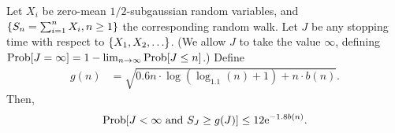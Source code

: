 \begin{lemma}
\label{lem:ACI-inequality}
Let $X_i$ be zero-mean $1/2$-subgaussian random variables,
and $\{ S_n = \sum_{i=1}^n X_i, n \geq 1 \}$ the corresponding random walk.
Let $J$ be any stopping time with respect to $\{ X_1, X_2, \ldots \}$.
(We allow $J$ to take the value $\infty$,
defining $\Prob{J = \infty} = 1 - \lim_{n \to \infty} \Prob{J \leq n}$.)
Define 
\begin{align*}
g(n) & = \sqrt{0.6 n \cdot \log (\log_{1.1}(n) + 1) + n \cdot b(n)}.
\end{align*}
Then, 
\begin{align*}
\Prob{J < \infty \mbox{ and } S_J \geq g(J)} \leq 12 \e^{-1.8 b(n)}.
\end{align*}
\end{lemma}

